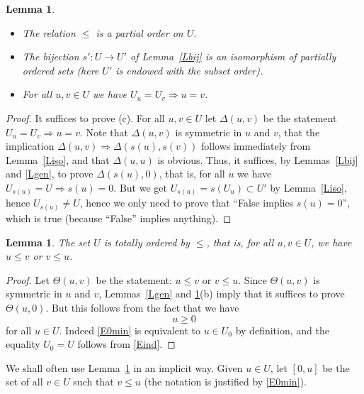 \documentclass[12pt,letterpaper]{article}
\newtheorem{lem}[thm]{Lemma} %
\begin{document}
\begin{lem}\label{Lpo} 
 \begin{itemize} 
  \item[\emph{(a)}] The relation \(\le\) is a partial order on \(U\). 
  \item[\emph{(b)}] The bijection \(s':U\to U'\) of Lemma~\ref{Lbij} is an isomorphism of partially ordered sets (here \(U'\) is endowed with the subset order). 
  \item[\emph{(c)}] For all \(u,v\in U\) we have \(U_u=U_v\Rightarrow u=v\). 
 \end{itemize} 
\end{lem} 
\begin{proof} 
It suffices to prove (c). For all \(u,v\in U\) let \(\Delta(u,v)\) be the statement \(U_u=U_v\Rightarrow u=v\). Note that \(\Delta(u,v)\) is symmetric in \(u\) and \(v\), that the implication \(\Delta(u,v)\Rightarrow\Delta(s(u),s(v))\) follows immediately from Lemma~\ref{Liso}, and that \(\Delta(u,u)\) is obvious. Thus, it suffices, by Lemmas~\ref{Lbij} and \ref{Lgen}, to prove \(\Delta(s(u),0)\), that is, for all \(u\) we have \(U_{s(u)}=U\Rightarrow s(u)=0\). But we get \(U_{s(u)}=s(U_u)\subset U'\) by Lemma~\ref{Liso}, hence \(U_{s(u)}\ne U\), hence we only need to prove that ``False implies \(s(u)=0\)'', which is true (because ``False'' implies anything). 
\end{proof} 

\begin{lem}\label{Ltot} 
The set \(U\) is \emph{totally} ordered by \(\le\), that is, for all \(u,v\in U\), we have \(u\le v\) or \(v\le u\). 
\end{lem} 
\begin{proof} 
Let \(\Theta(u,v)\) be the statement: \(u\le v\) or \(v\le u\). Since \(\Theta(u,v)\) is symmetric in \(u\) and \(v\), Lemmas~\ref{Lgen} and \ref{Lpo}(b) imply that it suffices to prove \(\Theta(u,0)\). But this follows from the fact that we have 
\begin{equation}\label{E0min}
u\ge0
\end{equation} 
for all \(u\in U\). Indeed \eqref{E0min} is equivalent to \(u\in U_0\) by definition, and the equality \(U_0=U\) follows from \eqref{Eind}. 
\end{proof} 

We shall often use Lemma~\ref{Ltot} in an implicit way. Given \(u\in U\), let \([0,u]\) be the set of all \(v\in U\) such that \(v\le u\) (the notation is justified by \eqref{E0min}). 
\end{document}
